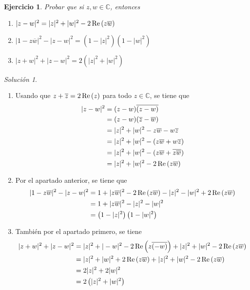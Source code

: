 \documentclass[11pt]{report}
\newcommand{\C}{\mathbb C}
\newcommand{\pars}[1]{\left( #1 \right)} %
\renewcommand{\Re}[1]{\,\textup{Re}\pars{#1}}
\newtheorem{exercise}{Ejercicio}
\theoremstyle{remark}
\newtheorem*{resolution}{Solución}
\begin{document}
\begin{exercise}
\label{ex4}
    Probar que si $z, w \in \C$, entonces
    \begin{enumerate}
        \item $|z-w|^2=|z|^2+|w|^2-2\Re{z\overline{w}}$
        \item $|1-z\overline{w}|^2-|z-w|^2 = \pars{1-|z|^2}\pars{1-|w|^2}$
        \item $|z+w|^2+|z-w|^2=2\pars{|z|^2+|w|^2}$
    \end{enumerate}
\end{exercise}

\begin{resolution}
    \hfill
    \begin{enumerate}
        \item Usando que $z+\overline{z}=2\Re{z}$ para todo $z \in \C$, se tiene que
        \[\begin{aligned}[t]
            |z-w|^2 &= (z-w)\overline{(z-w)} \\ &= (z-w)(\overline{z}-\overline{w}) \\ &= |z|^2+|w|^2-z\overline{w}-w\overline{z} \\ &= |z|^2+|w|^2-(z\overline{w}+w\overline{z}) \\ &= |z|^2+|w|^2-(z\overline{w}+\overline{z\overline{w}}) \\ &= |z|^2+|w|^2-2\Re{z\overline{w}}
        \end{aligned}\]
        \item Por el apartado anterior, se tiene que
        \[\begin{aligned}[t]
            |1-z\overline{w}|^2-|z-w|^2 &= 1+|z\overline{w}|^2-2\Re{z\overline{w}}-|z|^2-|w|^2+2\Re{z\overline{w}} \\ &=  1+|z\overline{w}|^2-|z|^2-|w|^2\\ &= \pars{1-|z|^2}\pars{1-|w|^2}
        \end{aligned}\]
        \item También por el apartado primero, se tiene
        \[\begin{aligned}[t]
            |z+w|^2+|z-w|^2 &= |z|^2+|-w|^2-2\Re{z\overline{(-w)}}+|z|^2+|w|^2-2\Re{z\overline{w}} \\ &= |z|^2+|w|^2+2\Re{z\overline{w}}+|z|^2+|w|^2-2\Re{z\overline{w}} \\ &= 2|z|^2+2|w|^2 \\ &= 2\pars{|z|^2+|w|^2} 
        \end{aligned}\]
    \end{enumerate}
\end{resolution}
\end{document}
